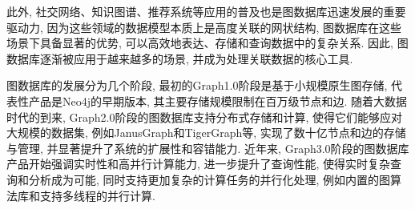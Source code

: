 此外, 社交网络、知识图谱、推荐系统等应用的普及也是图数据库迅速发展的重要驱动力, 因为这些领域的数据模型本质上是高度关联的网状结构, 图数据库在这些场景下具备显著的优势, 可以高效地表达、存储和查询数据中的复杂关系. 因此, 图数据库逐渐被应用于越来越多的场景, 并成为处理关联数据的核心工具.

图数据库的发展分为几个阶段, 最初的Graph1.0阶段是基于小规模原生图存储, 代表性产品是Neo4j的早期版本, 其主要存储规模限制在百万级节点和边. 随着大数据时代的到来, Graph2.0阶段的图数据库支持分布式存储和计算, 使得它们能够应对大规模的数据集, 例如JanusGraph和TigerGraph等, 实现了数十亿节点和边的存储与管理, 并显著提升了系统的扩展性和容错能力. 近年来, Graph3.0阶段的图数据库产品开始强调实时性和高并行计算能力, 进一步提升了查询性能, 使得实时复杂查询和分析成为可能, 同时支持更加复杂的计算任务的并行化处理, 例如内置的图算法库和支持多线程的并行计算.